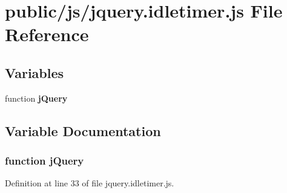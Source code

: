 \section{public/js/jquery.idletimer.\+js File Reference}
\label{public_2js_2jquery_8idletimer_8js}
\subsection*{Variables}
\begin{DoxyCompactItemize}
\item 
function {\bf j\+Query}
\end{DoxyCompactItemize}


\subsection{Variable Documentation}
\subsubsection[{j\+Query}]{\setlength{\rightskip}{0pt plus 5cm}function j\+Query}\label{public_2js_2jquery_8idletimer_8js_a1e853eabf9d8ee3ac2700c9a2ddda672}


Definition at line 33 of file jquery.\+idletimer.\+js.

